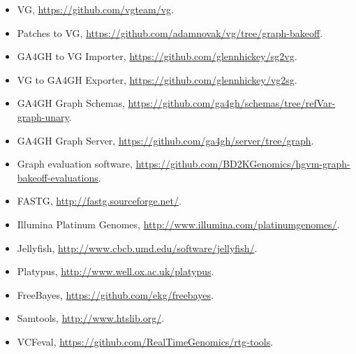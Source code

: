 \begin{itemize}
\item[] VG, \href{https://github.com/vgteam/vg}{https://github.com/vgteam/vg}.

\item[] Patches to VG,
\href{https://github.com/adamnovak/vg/tree/graph-bakeoff}{https://github.com/adamnovak/vg/tree/graph-bakeoff}.

\item[] GA4GH to VG Importer,
\href{https://github.com/glennhickey/sg2vg}{https://github.com/glennhickey/sg2vg}.

\item[] VG to GA4GH Exporter,
\href{https://github.com/glennhickey/vg2sg}{https://github.com/glennhickey/vg2sg}.

\item[] GA4GH Graph Schemas,
\href{https://github.com/ga4gh/schemas/tree/refVar-graph-unary}{https://github.com/ga4gh/schemas/tree/refVar-graph-unary}.

\item[] GA4GH Graph Server,
\href{https://github.com/ga4gh/server/tree/graph}{https://github.com/ga4gh/server/tree/graph}.

\item[] Graph evaluation software,
\href{https://github.com/BD2KGenomics/hgvm-graph-bakeoff-evaluations}{https://github.com/BD2KGenomics/hgvm-graph-bakeoff-evaluations}.

\item[] FASTG,
\href{http://fastg.sourceforge.net/}{http://fastg.sourceforge.net/}.

\item[] Illumina Platinum Genomes,
\href{http://www.illumina.com/platinumgenomes/}{http://www.illumina.com/platinumgenomes/}.

\item[] Jellyfish,
\href{http://www.cbcb.umd.edu/software/jellyfish/}{http://www.cbcb.umd.edu/software/jellyfish/}.

\item[] Platypus,
\href{http://www.well.ox.ac.uk/platypus}{http://www.well.ox.ac.uk/platypus}.

\item[] FreeBayes,
\href{https://github.com/ekg/freebayes}{https://github.com/ekg/freebayes}.

\item[] Samtools, \href{http://www.htslib.org/}{http://www.htslib.org/}.

\item[] VCFeval,
\href{https://github.com/RealTimeGenomics/rtg-tools}{https://github.com/RealTimeGenomics/rtg-tools}.
\end{itemize}

